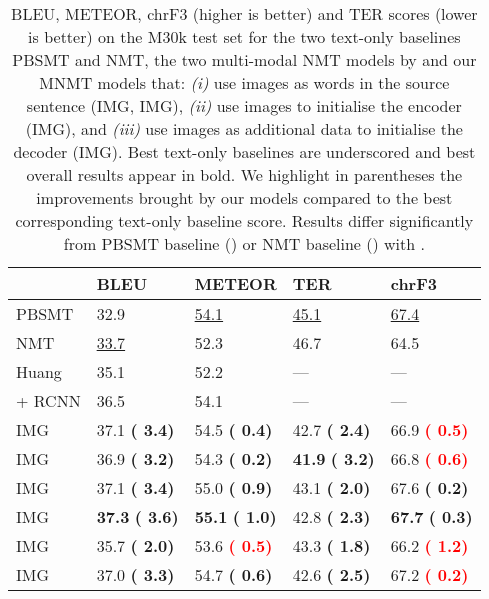 \documentclass[11pt,twocolumn]{article}
\newcommand{\white}[1]{\textcolor{White}{#1}}
\newcommand{\redbf}[1]{\textbf{\textcolor{Red}{#1}}}
\newcommand{\greenbf}[1]{\textbf{\textcolor{OliveGreen}{#1}}}
\begin{document}
\begin{table}[t!]
  \centering
  \resizebox{\linewidth}{!} {
  \begin{tabular}{lllll}
   \toprule
   & BLEU & METEOR & TER & chrF3 \\
   \toprule
   PBSMT &
   32.9 &
   \underline{54.1} &
   \underline{45.1} &
   \underline{67.4} \\
   
   NMT &
   \underline{33.7} &
   52.3 &
   46.7 &
   64.5 \\
   
   \midrule
   
Huang
   & 35.1 & 52.2 & --- & --- \\
   
   + RCNN
& 36.5 & 54.1 & --- & --- \\
   
   \midrule
   
   IMG &
   37.1 \small\greenbf{( 3.4)} &
   54.5\white{} \small\greenbf{( 0.4)} &
   42.7 \small\greenbf{( 2.4)} &
   66.9 \small\redbf{( 0.5)}\\
   
   IMG &
   36.9 \small\greenbf{( 3.2)} &
   54.3\white{} \small\greenbf{( 0.2)} &
   \textbf{41.9} \small\greenbf{( 3.2)} &
   66.8 \small\redbf{( 0.6)} \\
   
   IMG &
   37.1 \small\greenbf{( 3.4)} &
   55.0 \small\greenbf{( 0.9)} &
   43.1 \small\greenbf{( 2.0)} &
   67.6 \small\greenbf{( 0.2)}\\
   
   IMG &
   \textbf{37.3} \small\greenbf{( 3.6)} &
   \textbf{55.1} \small\greenbf{( 1.0)} &
   42.8 \small\greenbf{( 2.3)} &
   \textbf{67.7} \small\greenbf{( 0.3)}\\
   
   IMG &
   35.7 \small\greenbf{( 2.0)} &
   53.6\white{} \small\redbf{( 0.5)} &
   43.3 \small\greenbf{( 1.8)} &
   66.2 \small\redbf{( 1.2)}\\
   
   IMG &
   37.0 \small\greenbf{( 3.3)} &
   54.7\white{} \small\greenbf{( 0.6)} &
   42.6 \small\greenbf{( 2.5)} &
   67.2 \small\redbf{( 0.2)}\\
   
   \bottomrule
  \end{tabular}
  }
  \caption{
  BLEU, METEOR, chrF3 (higher is better) and TER scores (lower is better) on the M30k
  test set for the two text-only baselines PBSMT and NMT, the two multi-modal NMT models by 
  and our MNMT models that:
  \textit{(i)} use images as words in the source sentence (IMG, IMG),
  \textit{(ii)} use images to initialise the encoder (IMG), and
  \textit{(iii)} use images as additional data to initialise the decoder (IMG).
  Best text-only baselines are underscored and best overall results appear in bold.
  We highlight in parentheses the improvements brought by our models compared to the best corresponding text-only baseline score.
  Results differ significantly from PBSMT baseline () or NMT baseline () with .
  }
  \label{tbl:evaluation-translational-flickr30k}
\end{table}
\end{document}
